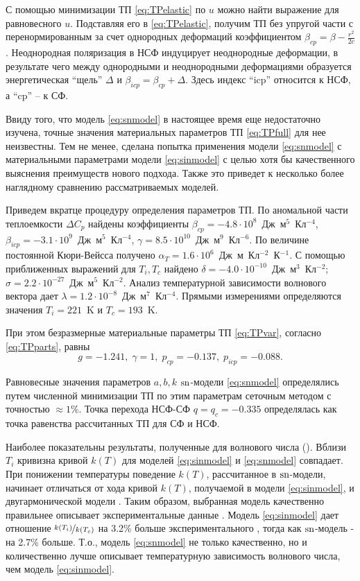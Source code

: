 С помощью минимизации ТП \eqref{eq:TPelastic} по $u$ можно найти выражение для равновесного $u$. 
Подставляя его в \eqref{eq:TPelastic}, получим ТП без упругой части с перенормированным за счет однородных деформаций коэффициентом $\beta_{cp} = \beta - \frac{r^2}{2c}$. 
Неоднородная поляризация в НСФ индуцирует неоднородные деформации, в результате чего между однородными и неоднородными деформациями образуется энергетическая ``щель'' $\Delta$ \cite{Vysochanskii1994} и $\beta_{icp} = \beta_{cp} + \Delta$. 
Здесь индекс ``icp'' относится к НСФ, а ``cp'' -- к СФ.

Ввиду того, что модель \eqref{eq:snmodel} в настоящее время еще недостаточно изучена, точные значения материальных параметров ТП \eqref{eq:TPfull} для нее неизвестны. 
Тем не менее, сделана попытка применения модели \eqref{eq:snmodel} с материальными параметрами модели \eqref{eq:sinmodel} с целью хотя бы качественного выяснения преимуществ нового подхода. 
Также это приведет к  несколько более наглядному сравнению рассматриваемых моделей.

Приведем вкратце процедуру определения параметров ТП. По аномальной части теплоемкости $\Delta C_p$ найдены коэффициенты $\beta_{cp} = -4.8\cdot10^8$~Дж~м$^5$~Кл$^{-4}$, $\beta_{icp} = -3.1\cdot10^9$~Дж~м$^5$~Кл$^{-4}$, $\gamma = 8.5\cdot10^{10}$~Дж~м$^9$~Кл$^{-6}$. По величине постоянной Кюри-Вейсса получено $\alpha_T = 1.6\cdot10^6$~Дж~м~Кл$^{-2}$~К$^{-1}$. С помощью приближенных выражений для $T_i, T_c$ найдено $\delta = -4.0\cdot10^{-10}$~Дж~м$^3$~Кл$^{-2}$; $\sigma = 2.2\cdot10^{-27}$~Дж~м$^5$~Кл$^{-2}$. Анализ температурной зависимости волнового вектора дает $\lambda = 1.2\cdot10^{-8}$~Дж~м$^7$~Кл$^{-4}$. Прямыми измерениями определяются значения $T_i=221$~K и $T_c=193$~K.

При этом безразмерные материальные параметры ТП \eqref{eq:TPvar}, согласно \eqref{eq:TPparts}, равны 
\begin{equation}\label{eq:initparams}
g = -1.241, \; \gamma = 1, \; p_{cp} = -0.137, \; p_{icp} = -0.088.
\end{equation}

Равновесные значения параметров $a,b,k$ $\operatorname{sn}$-модели \eqref{eq:snmodel} определялись путем численной минимизации ТП по этим параметрам сеточным методом с точностью $\approx 1\%$. Точка перехода НСФ-СФ $q = q_c = -0.335$ определялась как точка равенства рассчитанных ТП для СФ и НСФ.

Наиболее показательны результаты, полученные для волнового числа (). 
Вблизи $T_i$ кривизна кривой $k(T)$ для моделей \eqref{eq:sinmodel} и \eqref{eq:snmodel} совпадает. 
При понижении температуры поведение $k(T)$, рассчитанное в $\operatorname{sn}$-модели, начинает отличаться от хода кривой $k(T)$, получаемой в модели \eqref{eq:sinmodel}, и двугармонической модели \cite{Khoma1998}. 
Таким образом, выбранная модель качественно правильнее описывает экспериментальные данные . 
Модель \eqref{eq:sinmodel} дает отношение $\nicefrac{k(T_i)}{k(T_c)}$ на 3.2\% больше экспериментального \cite{Khoma1998}, тогда как $\operatorname{sn}$-модель - на 2.7\% больше. 
Т.о., модель \eqref{eq:snmodel} не только качественно, но и количественно лучше описывает температурную зависимость волнового числа, чем модель \eqref{eq:sinmodel}.


